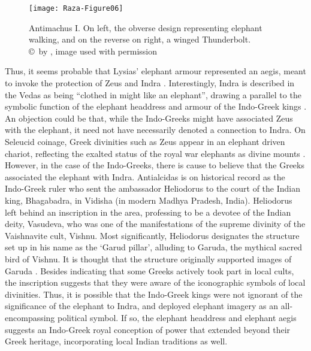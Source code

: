 \documentclass{ijsra}
\begin{document}
\begin{figure}[!htb] %
	\centering
	\texttt{[image: Raza-Figure06]}
	\caption{Antimachus I. On left, the obverse design representing elephant walking, and on the reverse on right, a winged Thunderbolt.
		{\normalfont\scriptsize \\ \copyright\ by \cite{Coin}, image used with permission}}
	\label{fig:Raza-Figure06}
\end{figure}

Thus, it seems probable that Lysias’ elephant armour represented an aegis, meant to invoke the protection of Zeus and Indra \parencite[71]{Whitehead1970}.
Interestingly, Indra is described in the Vedas as being “clothed in might like an elephant”, drawing a parallel to
the symbolic function of the elephant headdress and armour of the Indo-Greek kings \parencite[22]{Gupta1983}. 
An objection could be that, while the Indo-Greeks might have associated Zeus with the elephant,
it need not have necessarily denoted a connection to Indra. 
On Seleucid coinage, Greek divinities such as Zeus appear in an elephant driven chariot,
reflecting the exalted status of the royal war elephants as divine mounts \parencite[254--270]{Alonso2013}. 
However, in the case of the Indo-Greeks, there is cause to believe that the Greeks associated the elephant with Indra. 
Antialcidas is on historical record as the Indo-Greek ruler who sent the ambassador Heliodorus to the court of the Indian king,
Bhagabadra, in Vidisha (in modern Madhya Pradesh, India). 
Heliodorus left behind an inscription in the area, professing to be a devotee of the Indian deity, Vasudeva,
who was one of the manifestations of the supreme divinity of the Vaishnavite cult, Vishnu.
Most significantly, Heliodorus designates the structure set up in his name as the ‘Garud pillar’,
alluding to Garuda, the mythical sacred bird of Vishnu. 
It is thought that the structure originally supported images of Garuda \parencite[126--127]{Mairs2014}. 
Besides indicating that some Greeks actively took part in local cults, the inscription suggests that they were aware of
the iconographic symbols of local divinities. 
Thus, it is possible that the Indo-Greek kings were not ignorant of the significance of the elephant to Indra,
and deployed elephant imagery as an all-encompassing political symbol. 
If so, the elephant headdress and elephant aegis suggests an Indo-Greek royal conception of power that extended beyond
their Greek heritage, incorporating local Indian traditions as well.
\end{document}
